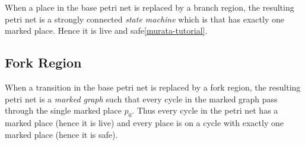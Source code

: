\documentclass[12pt,a4paper]{article}
\begin{document}
When a place in the base petri net is replaced by a branch region, the
resulting petri net is a strongly connected \emph{state machine} which
is that has exactly one marked place. Hence it is live and
safe\ref{murata-tutorial}.

\subsection{Fork Region}
\label{sec:fork-live-and-safe}

When a transition in the base petri net is replaced by a fork region,
the resulting petri net is a \emph{marked graph} such that every cycle
in the marked graph pass through the single marked place $p_0$. Thus
every cycle in the petri net has a marked place (hence it is live) and
every place is on a cycle with exactly one marked place (hence it is
safe).
\end{document}
